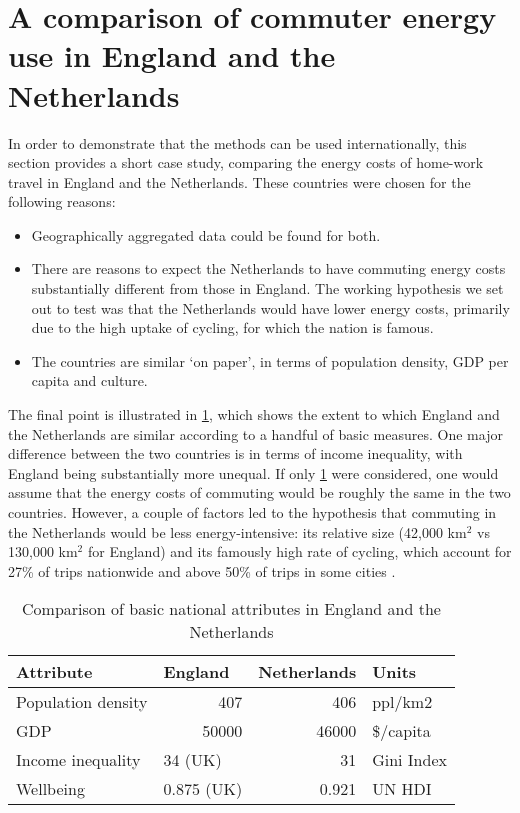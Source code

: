 \section{A comparison of commuter energy use in England and the Netherlands}
\label{sinternational}
In order to demonstrate that the methods can be used internationally,
this section provides a short case study, comparing the energy costs
of home-work travel in England and the Netherlands. These countries
were chosen for the following reasons:
\begin{itemize}
 \item Geographically aggregated data could be found for both.
 \item There are reasons to expect the Netherlands to have commuting energy costs
 substantially different from those in England. The working hypothesis we
 set out to test was that the Netherlands would have lower energy costs, primarily
 due to the high uptake of cycling, for which the nation is famous.
 \item The countries are similar `on paper', in terms of population density,
 GDP per capita and culture.
\end{itemize}
The final point is illustrated in \cref{tcompare}, which shows the extent to
which England and the Netherlands are similar according to a handful of basic
measures. One major difference between the two countries is in terms of
income inequality, with England being substantially more unequal.
If only \cref{tcompare} were considered, one would assume that the energy
costs of commuting would be roughly the same in the two countries. However,
a couple of factors led to the hypothesis that commuting in the Netherlands
would be less energy-intensive: its relative size (42,000 km$^2$ vs 130,000 km$^2$
for England) and its famously high rate of cycling, which account for
27\% of trips nationwide and above 50\% of trips in some cities
\citep{Pucher2008}.

\begin{table}[htbp]
\caption{Comparison of basic national attributes in England and the Netherlands}
\begin{center}
\begin{tabular}{llrl}
\toprule
Attribute & England & \multicolumn{1}{l}{Netherlands } & Units \\
\midrule
Population density & \multicolumn{1}{r}{407} & 406 & ppl/km2 \\
GDP & \multicolumn{1}{r}{50000} & 46000 & \$/capita \\
Income inequality & 34 (UK) & 31 & Gini Index \\
Wellbeing & 0.875 (UK) & 0.921 & UN HDI \\
\bottomrule
\end{tabular}\end{center}
\label{tcompare}
\end{table}

